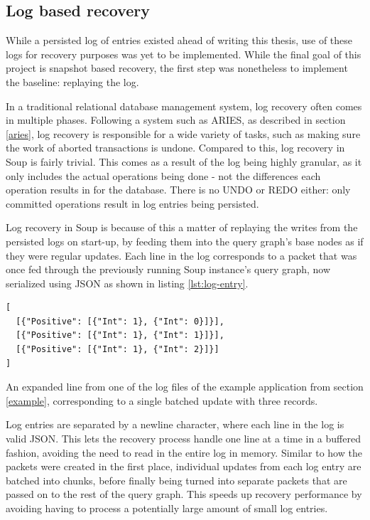 \documentclass[b5paper]{report}
\begin{document}
\subsection{Log based recovery} \label{sec:log-replay}
While a persisted log of entries existed ahead of writing this thesis, use of
these logs for recovery purposes was yet to be implemented. While the final goal
of this project is snapshot based recovery, the first step was nonetheless to
implement the baseline: replaying the log.

In a traditional relational database management system, log recovery often comes
in multiple phases. Following a system such as ARIES, as described in section
\ref{aries}, log recovery is responsible for a wide variety of tasks, such as
making sure the work of aborted transactions is undone. Compared to this, log
recovery in Soup is fairly trivial. This comes as a result of the log being
highly granular, as it only includes the actual operations being done - not the
differences each operation results in for the database. There is no UNDO or REDO
either: only committed operations result in log entries being persisted.

Log recovery in Soup is because of this a matter of replaying the writes from
the persisted logs on start-up, by feeding them into the query graph's base
nodes as if they were regular updates. Each line in the log corresponds to a
packet that was once fed through the previously running Soup instance's query
graph, now serialized using JSON as shown in listing \ref{lst:log-entry}.

\begin{listing}[H]
  \begin{verbatim}
[
  [{"Positive": [{"Int": 1}, {"Int": 0}]}],
  [{"Positive": [{"Int": 1}, {"Int": 1}]}],
  [{"Positive": [{"Int": 1}, {"Int": 2}]}]
]
  \end{verbatim}
  \caption{
    An expanded line from one of the log files of the example application from section
    \ref{example}, corresponding to a single batched update with three records.
    \label{lst:log-entry}
  }
\end{listing}

Log entries are separated by a newline character, where each line in the log
is valid JSON. This lets the recovery process handle one line at a time in a
buffered fashion, avoiding the need to read in the entire log in memory. Similar
to how the packets were created in the first place, individual updates from
each log entry are batched into chunks, before finally being turned into
separate packets that are passed on to the rest of the query graph. This speeds
up recovery performance by avoiding having to process a potentially large
amount of small log entries.
\end{document}
